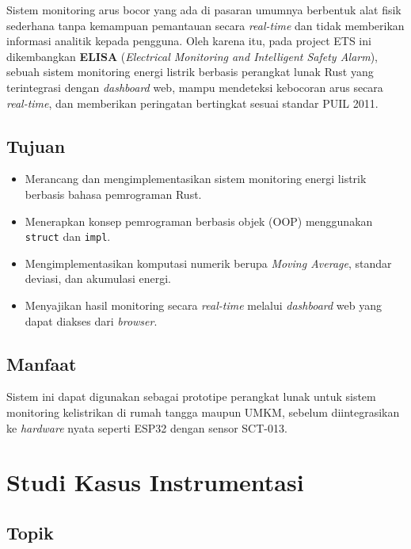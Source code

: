 \documentclass[12pt,a4paper]{article}
\begin{document}
Sistem monitoring arus bocor yang ada di pasaran umumnya berbentuk alat fisik
sederhana tanpa kemampuan pemantauan secara \emph{real-time} dan tidak memberikan
informasi analitik kepada pengguna. Oleh karena itu, pada project ETS ini
dikembangkan \textbf{ELISA} (\textit{Electrical Monitoring and Intelligent Safety
Alarm}), sebuah sistem monitoring energi listrik berbasis perangkat lunak Rust
yang terintegrasi dengan \emph{dashboard} web, mampu mendeteksi kebocoran arus
secara \emph{real-time}, dan memberikan peringatan bertingkat sesuai standar
PUIL 2011.

\subsection{Tujuan}

\begin{itemize}
    \item Merancang dan mengimplementasikan sistem monitoring energi listrik berbasis bahasa pemrograman Rust.
    \item Menerapkan konsep pemrograman berbasis objek (OOP) menggunakan \texttt{struct} dan \texttt{impl}.
    \item Mengimplementasikan komputasi numerik berupa \emph{Moving Average}, standar deviasi, dan akumulasi energi.
    \item Menyajikan hasil monitoring secara \emph{real-time} melalui \emph{dashboard} web yang dapat diakses dari \emph{browser}.
\end{itemize}

\subsection{Manfaat}

Sistem ini dapat digunakan sebagai prototipe perangkat lunak untuk sistem
monitoring kelistrikan di rumah tangga maupun UMKM, sebelum diintegrasikan ke
\emph{hardware} nyata seperti ESP32 dengan sensor SCT-013.

\section{Studi Kasus Instrumentasi}

\subsection{Topik}
\end{document}
